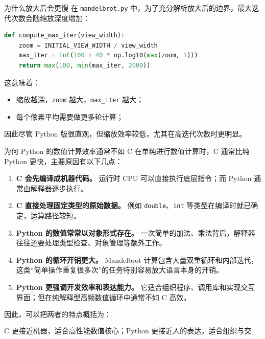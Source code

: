 \documentclass[aspectratio=169,11pt]{ctexbeamer}
\begin{document}
\begin{frame}[fragile]{为什么放大后会更慢}
在 \texttt{mandelbrot.py} 中，为了充分解析放大后的边界，最大迭代次数会随缩放深度增加：
\begin{lstlisting}[language=Python]
def compute_max_iter(view_width):
    zoom = INITIAL_VIEW_WIDTH / view_width
    max_iter = int(100 + 40 * np.log10(max(zoom, 1)))
    return max(100, min(max_iter, 2000))
\end{lstlisting}

这意味着：

\begin{itemize}
  \item 缩放越深，\texttt{zoom} 越大，\texttt{max\_iter} 越大；
  \item 每个像素平均需要做更多轮计算；
\end{itemize}

因此尽管 Python 版很直观，但缩放效率较低，尤其在高迭代次数时更明显。
\end{frame}

\begin{frame}{为何 Python 的数值计算效率通常不如 C}
在单纯进行数值计算时，C 通常比纯 Python 更快，主要原因有以下几点：

\begin{enumerate}
  \item \textbf{C 会先编译成机器代码。}  
  运行时 CPU 可以直接执行底层指令；而 Python 通常由解释器逐步执行。

  \item \textbf{C 直接处理固定类型的原始数据。}  
  例如 \texttt{double}、\texttt{int} 等类型在编译时就已确定，运算路径较短。

  \item \textbf{Python 的数值常常以对象形式存在。}  
  一次简单的加法、乘法背后，解释器往往还要处理类型检查、对象管理等额外工作。

  \item \textbf{Python 的循环开销更大。}  
  Mandelbrot 计算包含大量双重循环和内部迭代，这类“简单操作重复很多次”的任务特别容易放大语言本身的开销。

  \item \textbf{Python 更强调开发效率和表达能力。}  
  它适合组织程序、调用库和实现交互界面；但在纯解释型高频数值循环中通常不如 C 高效。
\end{enumerate}

\vspace{0.5em}
因此，可以把两者的特点概括为：

\[
\boxed{\text{C 更接近机器，适合高性能数值核心；Python 更接近人的表达，适合组织与交互。}}
\]
\end{frame}
\end{document}
